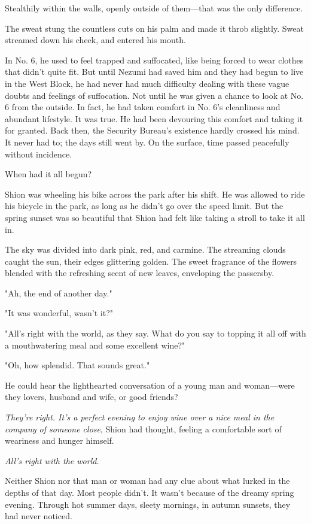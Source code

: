 Stealthily within the walls, openly outside of them---that was the only
difference.

The sweat stung the countless cuts on his palm and made it throb
slightly. Sweat streamed down his cheek, and entered his mouth.

In No. 6, he used to feel trapped and suffocated, like being forced to
wear clothes that didn't quite fit. But until Nezumi had saved him and
they had begun to live in the West Block, he had never had much
difficulty dealing with these vague doubts and feelings of suffocation.
Not until he was given a chance to look at No. 6 from the outside. In
fact, he had taken comfort in No. 6's cleanliness and abundant
lifestyle. It was true. He had been devouring this comfort and taking it
for granted. Back then, the Security Bureau's existence hardly crossed
his mind. It never had to; the days still went by. On the surface, time
passed peacefully without incidence.

When had it all begun?

Shion was wheeling his bike across the park after his shift. He was
allowed to ride his bicycle in the park, as long as he didn't go over
the speed limit. But the spring sunset was so beautiful that Shion had
felt like taking a stroll to take it all in.

The sky was divided into dark pink, red, and carmine. The streaming
clouds caught the sun, their edges glittering golden. The sweet
fragrance of the flowers blended with the refreshing scent of new
leaves, enveloping the passersby.

"Ah, the end of another day."

"It was wonderful, wasn't it?"

"All's right with the world, as they say. What do you say to topping it
all off with a mouthwatering meal and some excellent wine?"

"Oh, how splendid. That sounds great."

He could hear the lighthearted conversation of a young man and
woman---were they lovers, husband and wife, or good friends?

\emph{They're right. It's a perfect evening to enjoy wine over a nice meal in
the company of someone close}, Shion had thought, feeling a comfortable
sort of weariness and hunger himself.

\emph{All's right with the world.}

Neither Shion nor that man or woman had any clue about what lurked in
the depths of that day. Most people didn't. It wasn't because of the
dreamy spring evening. Through hot summer days, sleety mornings, in
autumn sunsets, they had never noticed.

